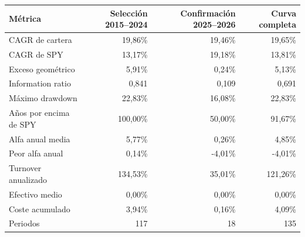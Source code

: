 \begin{tabular}{lrrr}
\toprule
Métrica & Selección 2015–2024 & Confirmación 2025–2026 & Curva completa \\
\midrule
CAGR de cartera & 19,86\% & 19,46\% & 19,65\% \\
CAGR de SPY & 13,17\% & 19,18\% & 13,81\% \\
Exceso geométrico & 5,91\% & 0,24\% & 5,13\% \\
Information ratio & 0,841 & 0,109 & 0,691 \\
Máximo drawdown & 22,83\% & 16,08\% & 22,83\% \\
Años por encima de SPY & 100,00\% & 50,00\% & 91,67\% \\
Alfa anual media & 5,77\% & 0,26\% & 4,85\% \\
Peor alfa anual & 0,14\% & -4,01\% & -4,01\% \\
Turnover anualizado & 134,53\% & 35,01\% & 121,26\% \\
Efectivo medio & 0,00\% & 0,00\% & 0,00\% \\
Coste acumulado & 3,94\% & 0,16\% & 4,09\% \\
Periodos & 117 & 18 & 135 \\
\bottomrule
\end{tabular}

